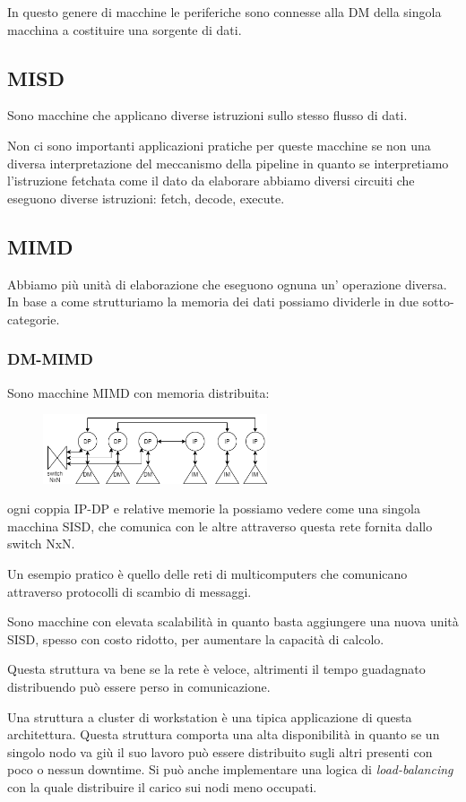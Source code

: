 In questo genere di macchine le periferiche sono connesse alla DM della singola macchina a costituire una sorgente di dati.

\subsection{MISD}
Sono macchine che applicano diverse istruzioni sullo stesso flusso di dati.

Non ci sono importanti applicazioni pratiche per queste macchine se non una diversa interpretazione del meccanismo della pipeline in quanto se interpretiamo l'istruzione fetchata come il dato da elaborare abbiamo diversi circuiti che eseguono diverse istruzioni: fetch, decode, execute.

\subsection{MIMD}
Abbiamo più unità di elaborazione che eseguono ognuna un' operazione diversa. In base a come strutturiamo la memoria dei dati possiamo dividerle in due sotto-categorie.

\subsubsection{DM-MIMD}
Sono macchine MIMD con memoria distribuita:
\begin{figure}[H]
    \centering
    \includegraphics[width=250px]{images/2_Tassonomia_di_Flynn/DM-MIMD.png}
\end{figure}
ogni coppia IP-DP e relative memorie la possiamo vedere come una singola macchina SISD, che comunica con le altre attraverso questa rete fornita dallo switch NxN.

Un esempio pratico è quello delle reti di multicomputers che comunicano attraverso protocolli di scambio di messaggi.

Sono macchine con elevata scalabilità in quanto basta aggiungere una nuova unità SISD, spesso con costo ridotto, per aumentare la capacità di calcolo.

Questa struttura va bene se la rete è veloce, altrimenti il tempo guadagnato distribuendo può essere perso in comunicazione.

Una struttura a cluster di workstation è una tipica applicazione di questa architettura.
Questa struttura comporta una alta disponibilità in quanto se un singolo nodo va giù il suo lavoro può essere distribuito sugli altri presenti con poco o nessun downtime.
Si può anche implementare una logica di \emph{load-balancing} con la quale distribuire il carico sui nodi meno occupati.


